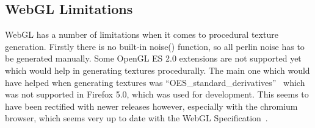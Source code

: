 \subsection{WebGL Limitations}
WebGL has a number of limitations when it comes to procedural texture generation.
Firstly there is no built-in noise() function, so all perlin noise has to be generated manually.
Some OpenGL ES 2.0 extensions are not supported yet which would help in generating textures procedurally.
The main one which would have helped when generating textures was ``OES\_standard\_derivatives''~\cite{web:oesstdder} which was not supported in Firefox 5.0, which was used for development.
This seems to have been rectified with newer releases however, especially with the chromium browser, which seems very up to date with the WebGL Specification~\cite{web:chromium}.

